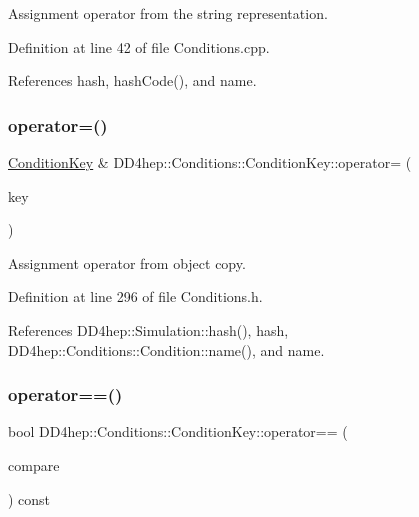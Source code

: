 Assignment operator from the string representation. 



Definition at line 42 of file Conditions.\+cpp.



References hash, hash\+Code(), and name.

\hypertarget{class_d_d4hep_1_1_conditions_1_1_condition_key_a4b89b384d431b3699986aa21935ddd8b}{}\label{class_d_d4hep_1_1_conditions_1_1_condition_key_a4b89b384d431b3699986aa21935ddd8b} 
\subsubsection{\texorpdfstring{operator=()}{operator=()}\hspace{0.1cm}{\footnotesize\ttfamily [2/2]}}
{\footnotesize\ttfamily \hyperlink{class_d_d4hep_1_1_conditions_1_1_condition_key}{Condition\+Key} \& D\+D4hep\+::\+Conditions\+::\+Condition\+Key\+::operator= (\begin{DoxyParamCaption}\item[{const \hyperlink{class_d_d4hep_1_1_conditions_1_1_condition_key}{Condition\+Key} \&}]{key }\end{DoxyParamCaption})\hspace{0.3cm}{\ttfamily [inline]}}



Assignment operator from object copy. 



Definition at line 296 of file Conditions.\+h.



References D\+D4hep\+::\+Simulation\+::hash(), hash, D\+D4hep\+::\+Conditions\+::\+Condition\+::name(), and name.

\hypertarget{class_d_d4hep_1_1_conditions_1_1_condition_key_a57ce7c47f281c85dd5b584e28589c30f}{}\label{class_d_d4hep_1_1_conditions_1_1_condition_key_a57ce7c47f281c85dd5b584e28589c30f} 
\subsubsection{\texorpdfstring{operator==()}{operator==()}\hspace{0.1cm}{\footnotesize\ttfamily [1/3]}}
{\footnotesize\ttfamily bool D\+D4hep\+::\+Conditions\+::\+Condition\+Key\+::operator== (\begin{DoxyParamCaption}\item[{const \hyperlink{class_d_d4hep_1_1_conditions_1_1_condition_key}{Condition\+Key} \&}]{compare }\end{DoxyParamCaption}) const\hspace{0.3cm}{\ttfamily [inline]}}



